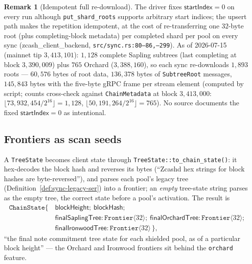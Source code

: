 \documentclass[11pt,a4paper]{article}
\theoremstyle{definition}
\newtheorem{remark}[theorem]{Remark}
\begin{document}
\begin{remark}[Idempotent full re-download]\label{rem:sync-tree-refetch}
The driver fixes $\mathsf{startIndex} = 0$ on every run although
\texttt{put\_shard\_roots} supports arbitrary start indices; the upsert
path makes the repetition idempotent, at the cost of re-transferring one
$32$-byte root (plus completing-block metadata) per completed shard per
pool on every sync
(\textsf{zcash\_client\_backend},
\texttt{src/sync.rs:80--86,--299}).
As of 2026-07-15 (mainnet tip $3{,}413{,}101$): $1{,}128$ complete
Sapling subtrees (last completing at block $3{,}390{,}009$) plus $765$
Orchard ($3{,}388{,}160$), so each sync re-downloads $1{,}893$ roots ---
$60{,}576$ bytes of root data, $136{,}378$ bytes of \texttt{SubtreeRoot}
messages, $145{,}843$ bytes with the five-byte gRPC frame per stream
element (computed by script; counts cross-check against
\texttt{ChainMetadata} at block $3{,}413{,}000$:
$\lfloor 73{,}932{,}454/2^{16}\rfloor = 1{,}128$,
$\lfloor 50{,}191{,}264/2^{16}\rfloor = 765$). No source documents the
fixed $\mathsf{startIndex}=0$ as intentional.
\end{remark}

\subsection{Frontiers as scan seeds}\label{sec:sync-tree-frontier}

A \texttt{TreeState} becomes client state through
\texttt{TreeState::to\_chain\_state()}: it hex-decodes the block hash and
reverses its bytes (``Zcashd hex strings for block hashes are
byte-reversed''), and parses each pool's legacy tree
(Definition~\ref{def:sync-legacy-ser}) into a frontier; an \emph{empty}
tree-state string parses as the empty tree, the correct state before a
pool's activation. The
result is
\[
\begin{aligned}
\texttt{ChainState}\{\,&\mathsf{blockHeight};\ \mathsf{blockHash}; \\
&\mathsf{finalSaplingTree} : \texttt{Frontier}\langle 32 \rangle;\
\mathsf{finalOrchardTree} : \texttt{Frontier}\langle 32 \rangle; \\
&\mathsf{finalIronwoodTree} : \texttt{Frontier}\langle 32 \rangle\,\},
\end{aligned}
\]
``the final note commitment tree state for each shielded pool, as of a
particular block height'' --- the Orchard and Ironwood frontiers sit
behind the \texttt{orchard} feature.
\end{document}
